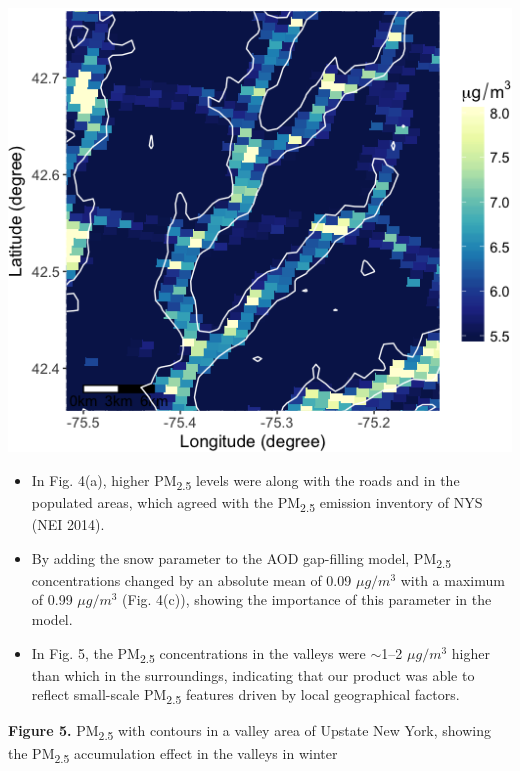 \documentclass[a0paper,portrait]{baposter}
\newcommand{\tsub}{\textsubscript}
\newcommand{\compresslist}{%
 \setlength{\itemsep}{0pt}%
 \setlength{\parskip}{0pt}%
 \setlength{\parsep}{0pt}%
 }
\begin{document}
\begin{poster}
{\vspace{5pt}

\begin{minipage}{0.345\textwidth}
\includegraphics[width=\textwidth]{valley.png}
\end{minipage}
\begin{minipage}{0.655\textwidth}
\begin{itemize}
\compresslist\small
    \item In Fig. 4(a), higher PM\tsub{2.5} levels were along with the roads and in the populated areas, which agreed with the PM\tsub{2.5} emission inventory of NYS (NEI 2014). 
    \item By adding the snow parameter to the AOD gap-filling model, PM\tsub{2.5} concentrations changed by an absolute mean of 0.09 $\mu g/m^3$ with a maximum of 0.99 $\mu g/m^3$ (Fig. 4(c)), showing the importance of this parameter in the model.
    \item In Fig. 5, the PM\tsub{2.5} concentrations in the valleys were $\sim$1--2 $\mu g/m^3$ higher than which in the surroundings, indicating that our product was able to reflect small-scale PM\tsub{2.5} features driven by local geographical factors.
\end{itemize}
\small{\textbf{Figure 5.} PM\tsub{2.5} with contours in a valley area of Upstate New York, showing the PM\tsub{2.5} accumulation effect in the valleys in winter}
\end{minipage}
}


\end{poster}
\end{document}

